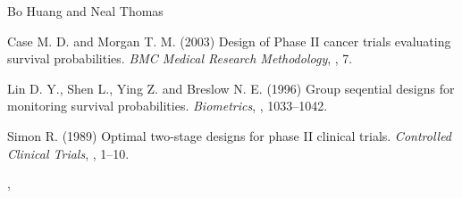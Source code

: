 \begin{Author}\relax
Bo Huang  and Neal Thomas
\end{Author}
\begin{References}\relax
Case M. D. and Morgan T. M. (2003) Design of Phase II cancer trials
evaluating survival probabilities. \emph{BMC Medical Research
Methodology}, , 7.

Lin D. Y., Shen L., Ying Z. and Breslow N. E. (1996) Group seqential
designs for monitoring survival probabilities. \emph{Biometrics},
, 1033--1042.

Simon R. (1989) Optimal two-stage designs for phase II clinical
trials. \emph{Controlled Clinical Trials}, , 1--10.
\end{References}
\begin{SeeAlso}\relax
{}, 
\end{SeeAlso}

